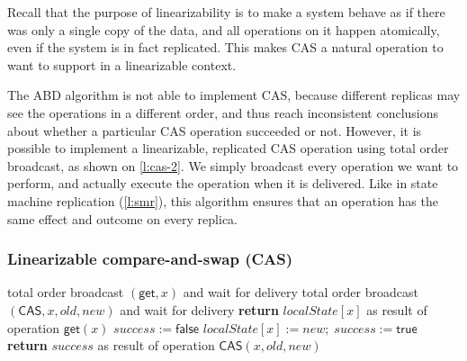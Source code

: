 Recall that the purpose of linearizability is to make a system behave as if there was only a single copy of the data, and all operations on it happen atomically, even if the system is in fact replicated.
This makes CAS a natural operation to want to support in a linearizable context.

The ABD algorithm is not able to implement CAS, because different replicas may see the operations in a different order, and thus reach inconsistent conclusions about whether a particular CAS operation succeeded or not.
However, it is possible to implement a linearizable, replicated CAS operation using total order broadcast, as shown on \autoref{l:cas-2}.
We simply broadcast every operation we want to perform, and actually execute the operation when it is delivered.
Like in state machine replication (\autoref{l:smr}), this algorithm ensures that an operation has the same effect and outcome on every replica.

\begin{frame}
    \label{s:cas-2}
    \frametitle{Linearizable compare-and-swap (CAS)}
    \footnotesize
    \begin{algorithmic}
            \State total order broadcast $(\mathsf{get}, x)$ and wait for delivery
        \EndOn
        \State
            \State total order broadcast $(\mathsf{CAS}, x, \mathit{old}, \mathit{new})$ and wait for delivery
        \EndOn
        \State
            \State \textbf{return} $\mathit{localState}[x]$ as result of operation $\mathsf{get}(x)$
        \EndOn
        \State
            \State $\mathit{success} := \mathsf{false}$
                \State $\mathit{localState}[x] := \mathit{new};\; \mathit{success} := \mathsf{true}$
            \EndIf
            \State \textbf{return} $\mathit{success}$ as result of operation $\mathsf{CAS}(x, \mathit{old}, \mathit{new})$
        \EndOn
    \end{algorithmic}
\end{frame}
\label{l:cas-2}

